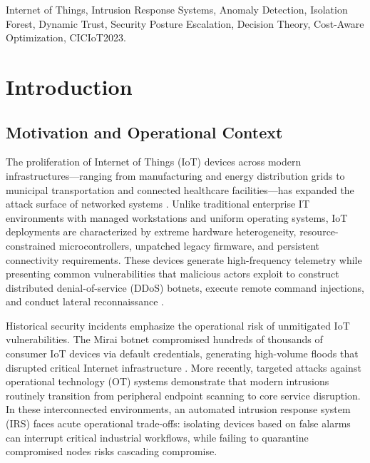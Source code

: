 \documentclass[journal,10pt,onecolumn]{IEEEtran}
\begin{document}
\begin{abstract}
\end{abstract}

\begin{IEEEkeywords}
Internet of Things, Intrusion Response Systems, Anomaly Detection, Isolation Forest, Dynamic Trust, Security Posture Escalation, Decision Theory, Cost-Aware Optimization, CICIoT2023.
\end{IEEEkeywords}



\section{Introduction}


\subsection{Motivation and Operational Context}
The proliferation of Internet of Things (IoT) devices across modern infrastructures—ranging from manufacturing and energy distribution grids to municipal transportation and connected healthcare facilities—has expanded the attack surface of networked systems \cite{18, 19}. Unlike traditional enterprise IT environments with managed workstations and uniform operating systems, IoT deployments are characterized by extreme hardware heterogeneity, resource-constrained microcontrollers, unpatched legacy firmware, and persistent connectivity requirements. These devices generate high-frequency telemetry while presenting common vulnerabilities that malicious actors exploit to construct distributed denial-of-service (DDoS) botnets, execute remote command injections, and conduct lateral reconnaissance \cite{19, 31}.

Historical security incidents emphasize the operational risk of unmitigated IoT vulnerabilities. The Mirai botnet compromised hundreds of thousands of consumer IoT devices via default credentials, generating high-volume floods that disrupted critical Internet infrastructure \cite{18, 19}. More recently, targeted attacks against operational technology (OT) systems demonstrate that modern intrusions routinely transition from peripheral endpoint scanning to core service disruption. In these interconnected environments, an automated intrusion response system (IRS) faces acute operational trade-offs: isolating devices based on false alarms can interrupt critical industrial workflows, while failing to quarantine compromised nodes risks cascading compromise.
\end{document}
